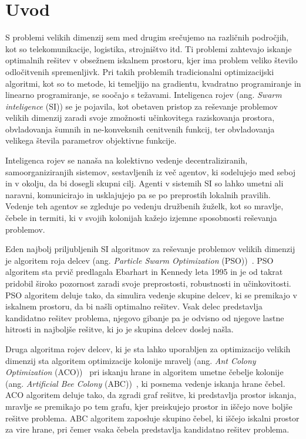 \chapter{Uvod}\label{cahp:uvod}
S problemi velikih dimenzij sem med drugim srečujemo na različnih področjih, kot so telekomunikacije, logistika, strojništvo itd.
Ti problemi zahtevajo iskanje optimalnih rešitev v obsežnem iskalnem prostoru, kjer ima problem veliko število odločitvenih spremenljivk.
Pri takih problemih tradicionalni optimizacijski algoritmi, kot so to metode, ki temeljijo na gradientu, kvadratno programiranje in linearno programiranje, se soočajo s težavami.
Inteligenca rojev (ang. \textit{Swarm inteligence} (SI)) se je pojavila, kot obetaven pristop za reševanje problemov velikih dimenzij zaradi svoje zmožnosti učinkovitega raziskovanja prostora, obvladovanja šumnih in ne-konveksnih cenitvenih funkcij, ter obvladovanja velikega števila parametrov objektivne funkcije.

Inteligenca rojev se nanaša na kolektivno vedenje decentraliziranih, samoorganiziranjih sistemov, sestavljenih iz več agentov, ki sodelujejo med seboj in v okolju, da bi dosegli skupni cilj.
Agenti v sistemih SI so lahko umetni ali naravni, komunicirajo in usklajujejo pa se po preprostih lokalnih pravilih.
Vedenje teh agentov se zgleduje po vedenju družbenih žuželk, kot so mravlje, čebele in termiti, ki v svojih kolonijah kažejo izjemne sposobnosti reševanja problemov.

Eden najbolj priljubljenih SI algoritmov za reševanje problemov velikih dimenzij je algoritem roja delcev (ang. \textit{Particle Swarm Optimization} (PSO))~\cite{alg:pso}.
PSO algoritem sta prvič predlagala Ebarhart in Kennedy leta 1995 in je od takrat pridobil široko pozornost zaradi svoje preprostosti, robustnosti in učinkovitosti.
PSO algoritem deluje tako, da simulira vedenje skupine delcev, ki se premikajo v iskalnem prostoru, da bi našli optimalno rešitev.
Vsak delec predstavlja kandidatno rešitev problema, njegovo gibanje pa je odvisno od njegove lastne hitrosti in najboljše rešitve, ki jo je skupina delcev doslej našla.

Druga algoritma rojev delcev, ki je sta lahko uporabljen za optimizacijo velikih dimenzij sta algoritem optimizacije kolonije mravelj (ang. \textit{Ant Colony Optimization} (ACO))~\cite{alg:aco} pri iskanju hrane in algoritem umetne čebelje kolonije (ang. \textit{Artificial Bee Colony} (ABC))~\cite{alg:abc}, ki posnema vedenje iskanja hrane čebel.
ACO algoritem deluje tako, da zgradi graf rešitve, ki predstavlja prostor iskanja, mravlje se premikajo po tem grafu, kjer preiskujejo prostor in iščejo nove boljše rešitve problema.
ABC algoritem zaposluje skupino čebel, ki iščejo iskalni prostor za vire hrane, pri čemer vsaka čebela predstavlja kandidatno rešitev problema.

